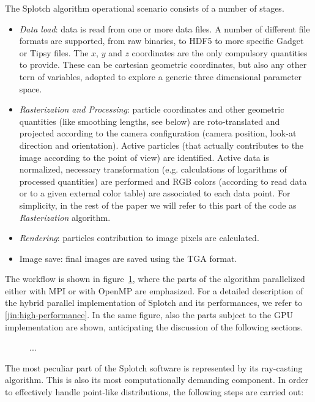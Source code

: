 \documentclass[11pt]{article}
\begin{document}
The Splotch algorithm operational scenario consists of a number of stages. 
\begin{itemize}
\item
{\it Data load}: data is read from one or more data files. A number of different file
formats are supported, from raw binaries, to HDF5 to more specific 
Gadget \cite{gadgeturl} or Tipsy \cite{tipsyurl}
files. The $x$, $y$ and $z$ coordinates are the only compulsory quantities to provide.
These can be cartesian geometric coordinates, but also any other tern 
of variables, adopted to explore a generic three dimensional parameter space.
\item
{\it Rasterization and Processing}: particle coordinates and other geometric quantities 
(like smoothing lengths, see below) are roto-translated and projected according to the 
camera configuration (camera position, look-at direction and orientation). 
Active particles (that actually contributes to the image according to the point of view)
are identified. Active data is normalized, necessary 
transformation (e.g. calculations of logarithms of processed quantities) are performed
and RGB colors (according to read data or to a given
external color table) are associated to each data point. For simplicity, in the rest 
of the paper we will refer to this part of the code as {\it Rasterization} algorithm.
\item
{\it Rendering}: particles contribution to image pixels are calculated.
\item
Image save: final images are saved using the TGA format.
\end{itemize}
The workflow is shown in figure~\ref{fig:workflow}, where the parts of the algorithm parallelized
either with MPI or with OpenMP are emphasized. For a detailed description of
the hybrid parallel implementation of Splotch and its performances, 
we refer to \ref{jin:high-performance}.
In the same figure, also the parts subject to the GPU implementation are shown, 
anticipating the discussion of the following sections.

\begin{figure}
\centering
\caption{...}
\label{fig:workflow}
\end{figure}

The most peculiar part of the Splotch software is represented by its ray-casting algorithm.
This is also its most computationally demanding component.
In order to effectively handle point-like distributions, the following 
steps are carried out: 
\end{document}
